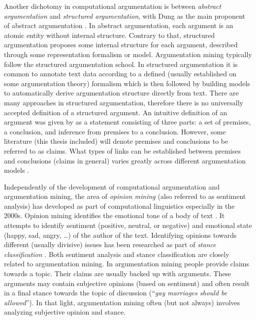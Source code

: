 Another dichotomy in computational argumentation is between 
\emph{abstract argumentation} and \emph{structured argumentation}, with
Dung as the main proponent of abstract argumentation \citep{dung1995acceptability,
bondarenko1997abstract}. In abstract argumentation, each argument is an
atomic entity without internal structure. Contrary to that, 
structured argumentation proposes some internal structure for each argument, 
described through some representation formalism or model. 
Argumentation mining typically follow the structured argumentation
school. In structured argumentation it is common to annotate text data according to
a defined (usually established on some argumentation theory) formalism which is
then followed by building models to automatically derive argumentation
structure directly from text. There are many approaches in structured
argumentation, therefore there is no universally accepted definition of a
structured argument.  An intuitive definition of an argument was given by
\citet{walton1998new} as a statement consisting of three parts: a set of
premises, a conclusion, and inference from premises to a conclusion. However,
some literature (this thesis included) will denote premises and conclusions to
be referred to as claims.  What types of links can be established between
premises and conclusions (claims in general) varies greatly across different
argumentation models \citep{lippi2016argumentation}.

Independently of the development of computational argumentation and argumentation
mining, the area of \emph{opinion mining} (also referred to as sentiment
analysis) has developed as part of computational linguistics especially in the
2000s. Opinion mining identifies the emotional tone of a body of text
\citep{pang2008opinion}.  It attempts to identify sentiment (positive, neutral,
or negative) and emotional state (happy, sad, angry, \dots) of the author of
the text.  Identifying opinions towards different (usually divisive) issues has
been researched as part of \emph{stance classification}
\citep{walker2012stance, hasan2013stance}.  Both sentiment analysis and stance
classification
are closely related to argumentation mining. In argumentation mining people
provide claims towards a topic. Their claims are usually backed up with arguments. These
arguments may contain subjective opinions (based on sentiment) and often result
in a final stance towards the topic of discussion (``\emph{gay marriages
should be allowed}''). In that light, argumentation mining often
(but not always) involves analyzing subjective opinion and stance. 

